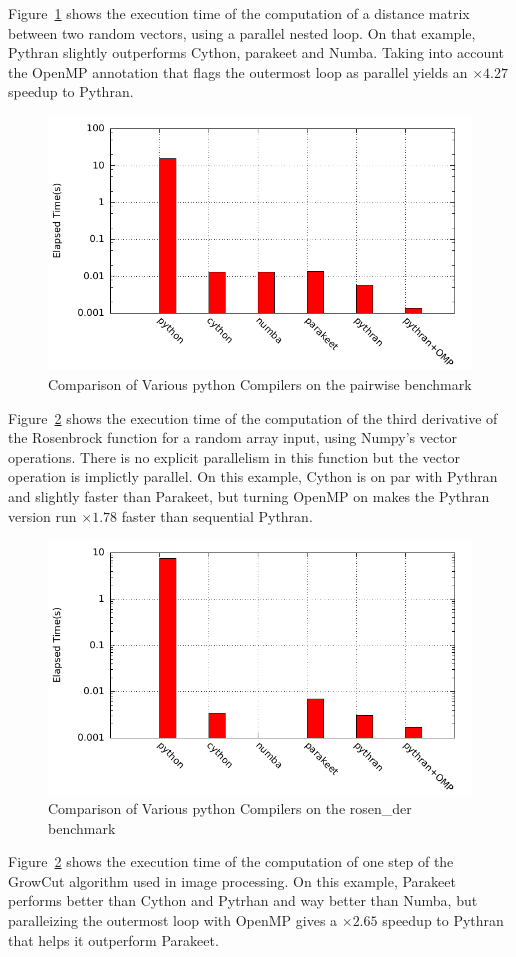 \documentclass[conference]{IEEEtran}
\begin{document}
Figure~\ref{fig:pb-pairwise} shows the execution time of the computation of a
distance matrix between two random vectors, using a parallel nested loop. On
that example, Pythran slightly outperforms Cython, parakeet and Numba. Taking
into account the OpenMP annotation that flags the outermost loop as parallel
yields an $\times 4.27$ speedup to Pythran.

\begin{figure}[ht]
    \includegraphics[width=.5\textwidth]{pairwise}
    \caption{Comparison of Various python Compilers on the pairwise benchmark}
    \label{fig:pb-pairwise}
\end{figure}

Figure~\ref{fig:pb-rosen} shows the execution time of the computation of the
third derivative of the Rosenbrock function for a random array input, using
Numpy's vector operations. There is no explicit parallelism in this function but
the vector operation is implictly parallel. On this example, Cython is on par
with Pythran and slightly faster than Parakeet, but turning OpenMP on makes the
Pythran version run $\times 1.78$ faster than sequential Pythran.

\begin{figure}[ht]
    \includegraphics[width=.5\textwidth]{rosen_der}
    \caption{Comparison of Various python Compilers on the rosen\_der benchmark}
    \label{fig:pb-rosen}
\end{figure}

Figure~\ref{fig:pb-rosen} shows the execution time of the computation of one
step of the GrowCut algorithm used in image processing. On this example,
Parakeet performs better than Cython and Pytrhan and way better than Numba, but
paralleizing the outermost loop with OpenMP gives a $\times 2.65$ speedup to
Pythran that helps it outperform Parakeet.
\end{document}
